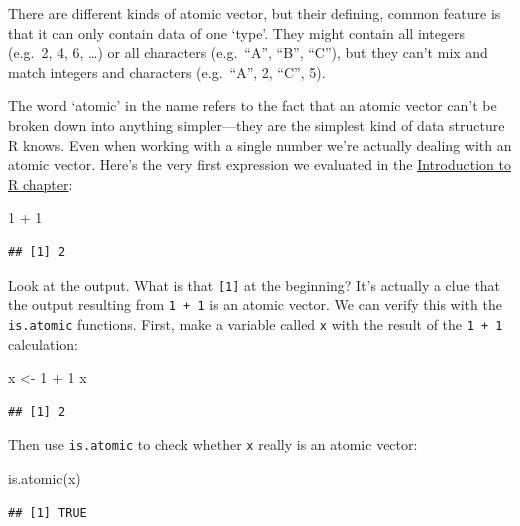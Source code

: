 \documentclass[
]{book}
\newenvironment{Shaded}{\begin{snugshade}}{\end{snugshade}}
\newcommand{\DecValTok}[1]{\textcolor[rgb]{0.00,0.00,0.81}{#1}}
\newcommand{\FunctionTok}[1]{\textcolor[rgb]{0.00,0.00,0.00}{#1}}
\newcommand{\NormalTok}[1]{#1}
\newcommand{\OtherTok}[1]{\textcolor[rgb]{0.56,0.35,0.01}{#1}}
\newcommand{\SpecialCharTok}[1]{\textcolor[rgb]{0.00,0.00,0.00}{#1}}
\begin{document}
There are different kinds of atomic vector, but their defining, common feature is that it can only contain data of one `type'. They might contain all integers (e.g.~2, 4, 6, \ldots) or all characters (e.g.~``A'', ``B'', ``C''), but they can't mix and match integers and characters (e.g.~``A'', 2, ``C'', 5).

The word `atomic' in the name refers to the fact that an atomic vector can't be broken down into anything simpler---they are the simplest kind of data structure R knows. Even when working with a single number we're actually dealing with an atomic vector. Here's the very first expression we evaluated in the \protect\hyperlink{r-calculator}{Introduction to R chapter}:

\begin{Shaded}
\begin{Highlighting}[]
\DecValTok{1} \SpecialCharTok{+} \DecValTok{1}
\end{Highlighting}
\end{Shaded}

\begin{verbatim}
## [1] 2
\end{verbatim}

Look at the output. What is that \texttt{{[}1{]}} at the beginning? It's actually a clue that the output resulting from \texttt{1\ +\ 1} is an atomic vector. We can verify this with the \texttt{is.atomic} functions. First, make a variable called \texttt{x} with the result of the \texttt{1\ +\ 1} calculation:

\begin{Shaded}
\begin{Highlighting}[]
\NormalTok{x }\OtherTok{\textless{}{-}} \DecValTok{1} \SpecialCharTok{+} \DecValTok{1}
\NormalTok{x}
\end{Highlighting}
\end{Shaded}

\begin{verbatim}
## [1] 2
\end{verbatim}

Then use \texttt{is.atomic} to check whether \texttt{x} really is an atomic vector:

\begin{Shaded}
\begin{Highlighting}[]
\FunctionTok{is.atomic}\NormalTok{(x)}
\end{Highlighting}
\end{Shaded}

\begin{verbatim}
## [1] TRUE
\end{verbatim}
\end{document}
